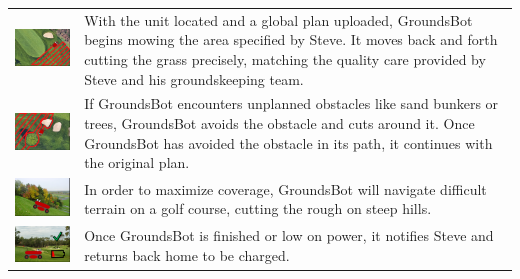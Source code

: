 \documentclass[12pt]{extarticle}
\begin{document}
\begin{table}[H]
\begin{tabularx}{\textwidth}{cX}
\includegraphics[width=6cm, valign=t]{usecase1_5.png} &
With the unit located and a global plan uploaded, GroundsBot begins mowing the area specified by Steve. It moves back and forth cutting the grass precisely, matching the quality care provided by Steve and his groundskeeping team.
\\
\includegraphics[width=6cm, valign=t]{usecase1_6.png} &
If GroundsBot encounters unplanned obstacles like sand bunkers or trees, GroundsBot avoids the obstacle and cuts around it. Once GroundsBot has avoided the obstacle in its path, it continues with the original plan.
\\
\includegraphics[width=6cm, valign=t]{usecase1_7.png} &
In order to maximize coverage, GroundsBot will navigate difficult terrain on a golf course, cutting the rough on steep hills.
\\
\includegraphics[width=6cm, valign=t]{usecase2_1.png} &
Once GroundsBot is finished or low on power, it notifies Steve and returns back home to be charged.
\\

\end{tabularx}
\end{table}
\end{document}
